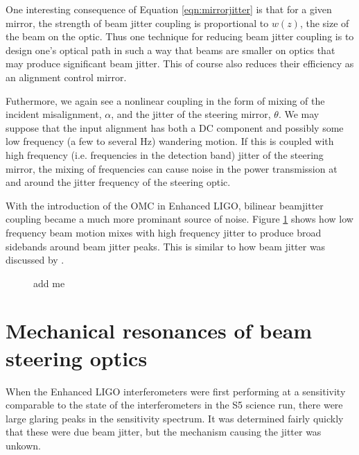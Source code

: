 One interesting consequence of Equation \ref{eqn:mirrorjitter} is that for a given mirror, the strength of beam jitter coupling is proportional to $w(z)$, the size of the beam on the optic. %
Thus one technique for reducing beam jitter coupling is to design one's optical path in such a way that beams are smaller on optics that may produce significant beam jitter. %
This of course also reduces their efficiency as an alignment control mirror.

Futhermore, we again see a nonlinear coupling in the form of mixing of the incident misalignment, $\alpha$, and the jitter of the steering mirror, $\theta$. %
We may suppose that the input alignment has both a DC component and possibly some low frequency (a few to several Hz) wandering motion. %
If this is coupled with high frequency (i.e. %
frequencies in the detection band) jitter of the steering mirror, the mixing of frequencies can cause noise in the power transmission at and around the jitter frequency of the steering optic.

With the introduction of the OMC in Enhanced LIGO, bilinear beamjitter coupling became a much more prominant source of noise. %
Figure \ref{fig:bilinear} shows how low frequency beam motion mixes with high frequency jitter to produce broad sidebands around beam jitter peaks. %
This is similar to how beam jitter was discussed by \citet{Tobin}.

\begin{figure}
  \begin{center}
  \leavevmode
  \end{center}
  \caption[add me]{add me}
  \label{fig:bilinear}
\end{figure}

\section{Mechanical resonances of beam steering optics}
When the Enhanced LIGO interferometers were first performing at a sensitivity comparable to the state of the interferometers in the S5 science run, there were large glaring peaks in the sensitivity spectrum. %
It was determined fairly quickly that these were due beam jitter, but the mechanism causing the jitter was unkown.

